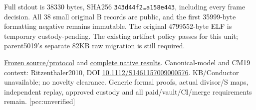 \documentclass[10pt,a4paper]{article}
\begin{document}
Full stdout is 38330 bytes, SHA256
\texttt{343d44f2\ldots a158e443}, including every frame decision.
All 38 small original B records are public, and the first 35999-byte
formatting negative remains immutable. The original 4799552-byte ELF is
temporary custody-pending. The existing artifact policy passes for this
unit; parent5019's separate 82KB raw migration is still required.

\href{https://github.com/isogeny-labs/crypto/tree/3916f563ce5717f50ee1716ac10a9c979e5f656c/research/chained_cm19_curve_maps_20261123}{Frozen source/protocol}
and
\href{https://github.com/isogeny-labs/crypto/tree/62daac1e0c57cf04009fb57952dd6975339facd5/research/chained_cm19_curve_maps_20261123}{complete native results}.
Canonical-model and CM19 context: Ritzenthaler2010, DOI
\href{https://doi.org/10.1112/S1461157009000576}{10.1112/S1461157009000576}.
KB/Conductor unavailable; no novelty clearance. Generic formal proofs,
actual divisor/S maps, independent replay, approved custody and all
paid/vault/CI/merge requirements remain. [pcc:unverified]
\end{document}
